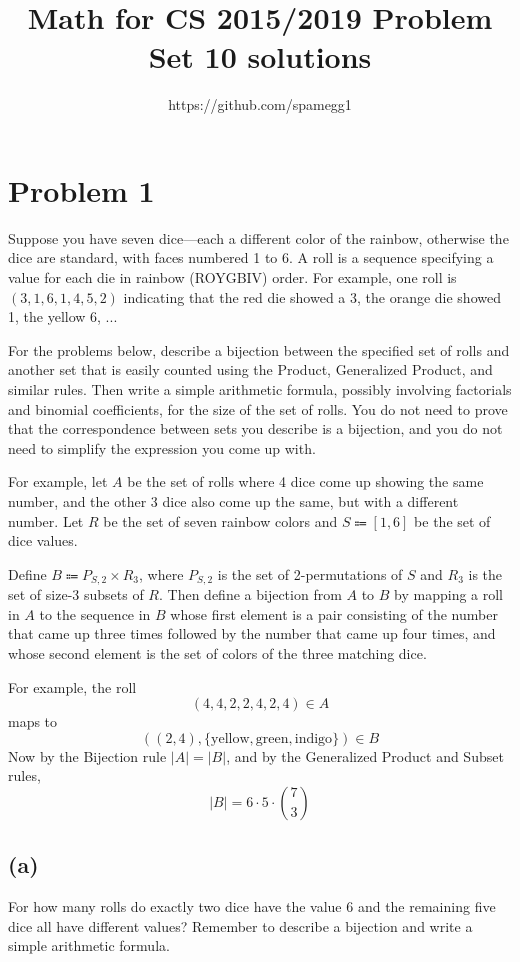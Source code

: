 \documentclass[14pt]{extarticle}
\title{Math for CS 2015/2019 Problem Set 10 solutions}
\author{https://github.com/spamegg1}
\begin{document}
\maketitle
\tableofcontents

\section{Problem 1}
Suppose you have seven dice—each a different color of the rainbow, otherwise the dice are standard, with faces numbered 1 to 6. A roll is a sequence specifying a value for each die in rainbow (ROYGBIV) order.
For example, one roll is $(3, 1, 6, 1, 4, 5, 2)$ indicating that the red die showed a 3, the orange die showed 1, the yellow 6, ...

For the problems below, describe a bijection between the specified set of rolls and another set that is easily counted using the Product, Generalized Product, and similar rules. Then write a simple arithmetic formula, possibly involving factorials and binomial coefficients, for the size of the set of rolls. You do not need to prove that the correspondence between sets you describe is a bijection, and you do not need to simplify the expression you come up with.

For example, let $A$ be the set of rolls where 4 dice come up showing the same number, and the other 3 dice also come up the same, but with a different number. Let $R$ be the set of seven rainbow colors and $S \Coloneqq [1, 6]$ be the set of dice values. 

Define $B \Coloneqq P_{S,2} \times R_3$, where $P_{S,2}$ is the set of 2-permutations of $S$ and $R_3$ is the set of size-3 subsets of $R$. Then define a bijection from $A$ to $B$ by mapping a roll in $A$ to the sequence in $B$ whose first element is a pair consisting of the number that came up three times followed by the number that came up four times, and whose second element is the set of colors of the three matching dice. 

For example, the roll
$$
(4, 4, 2, 2, 4, 2, 4) \in A
$$
maps to
$$
((2, 4), \{\text{yellow}, \text{green}, \text{indigo}\}) \in B
$$
Now by the Bijection rule $|A| = |B|$, and by the Generalized Product and Subset rules,
$$
|B| = 6 \cdot 5 \cdot \binom{7}{3}
$$
\subsection{(a)}
For how many rolls do exactly two dice have the value 6 and the remaining five dice all have different values? Remember to describe a bijection and write a simple arithmetic formula.
\end{document}
